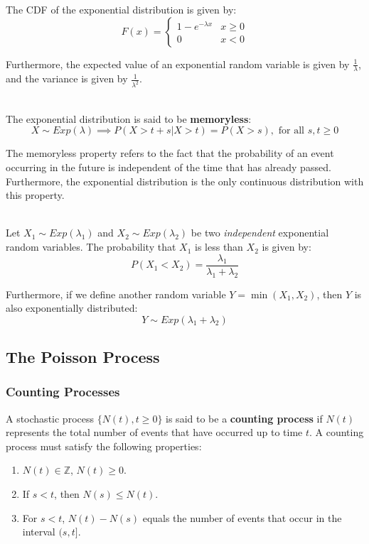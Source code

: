 \documentclass[12pt]{article}
\begin{document}
\noindent
The CDF of the exponential distribution is given by:
\[ F(x) = \begin{cases}
    1 - e^{-\lambda x} & x \geq 0 \\
    0 & x < 0
\end{cases} \]

\noindent
Furthermore, the expected value of an exponential random variable is given by $\frac{1}{\lambda}$, and the variance is given by $\frac{1}{\lambda^2}$.

\noindent
\\
The exponential distribution is said to be \textbf{memoryless}:
\[ X \sim Exp(\lambda) \implies P(X > t + s | X > t) = P(X > s), \text{ for all } s, t \geq 0 \]

\noindent
The memoryless property refers to the fact that the probability of an event occurring in the future is independent of the time that has already passed.
Furthermore, the exponential distribution is the only continuous distribution with this property.

\indent
\\
Let $X_1 \sim Exp(\lambda_1)$ and $X_2 \sim Exp(\lambda_2)$ be two \textit{independent} exponential random variables.
The probability that $X_1$ is less than $X_2$ is given by:
\[ P(X_1 < X_2) = \frac{\lambda_1}{\lambda_1 + \lambda_2} \]

\noindent
Furthermore, if we define another random variable $Y = \min(X_1, X_2)$, then $Y$ is also exponentially distributed:
\[ Y \sim Exp(\lambda_1 + \lambda_2) \]

\subsection{The Poisson Process}
\subsubsection{Counting Processes}
A stochastic process $\{ N(t), t \geq 0 \}$ is said to be a \textbf{counting process} if $N(t)$ represents the total number of events that have occurred up to time $t$.
A counting process must satisfy the following properties:

\begin{enumerate}
    \item $N(t) \in \mathbb{Z}$, $N(t) \geq 0$.
    \item If $s < t$, then $N(s) \leq N(t)$.
    \item For $s < t$, $N(t) - N(s)$ equals the number of events that occur in the interval $(s, t]$.
\end{enumerate}
\end{document}

